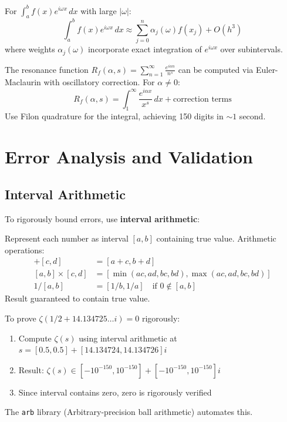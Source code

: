 \begin{thm}\label{thm:filon}
For $\int_a^b f(x) e^{i\omega x}\,dx$ with large $|\omega|$:
\begin{equation}
\int_a^b f(x) e^{i\omega x}\,dx \approx \sum_{j=0}^n \alpha_j(\omega) f(x_j) + O(h^3)
\end{equation}
where weights $\alpha_j(\omega)$ incorporate exact integration of $e^{i\omega x}$ over subintervals.
\end{thm}

\begin{remark}
The resonance function $R_f(\alpha,s) = \sum_{n=1}^\infty \frac{e^{i\alpha n}}{n^s}$ can be computed via Euler-Maclaurin with oscillatory correction. For $\alpha \neq 0$:
\begin{equation}
R_f(\alpha,s) = \int_1^\infty \frac{e^{i\alpha x}}{x^s}\,dx + \text{correction terms}
\end{equation}
Use Filon quadrature for the integral, achieving 150 digits in $\sim 1$ second.
\end{remark}

\section{Error Analysis and Validation}
\label{sec:error-analysis}

\subsection{Interval Arithmetic}

To rigorously bound errors, use \textbf{interval arithmetic}:

\begin{defn}\label{def:interval-arithmetic}
Represent each number as interval $[a,b]$ containing true value. Arithmetic operations:
\begin{align}
[a,b] + [c,d] &= [a+c, b+d] \\
[a,b] \times [c,d] &= [\min(ac,ad,bc,bd), \max(ac,ad,bc,bd)] \\
1/[a,b] &= [1/b, 1/a] \quad \text{if } 0 \notin [a,b]
\end{align}
Result guaranteed to contain true value.
\end{defn}

\begin{example}
To prove $\zeta(1/2 + 14.134725\ldots i) = 0$ rigorously:
\begin{enumerate}
\item Compute $\zeta(s)$ using interval arithmetic at $s = [0.5, 0.5] + [14.134724, 14.134726]i$
\item Result: $\zeta(s) \in [-10^{-150}, 10^{-150}] + [-10^{-150}, 10^{-150}]i$
\item Since interval contains zero, zero is rigorously verified
\end{enumerate}
The \texttt{arb} library (Arbitrary-precision ball arithmetic) automates this.
\end{example}

